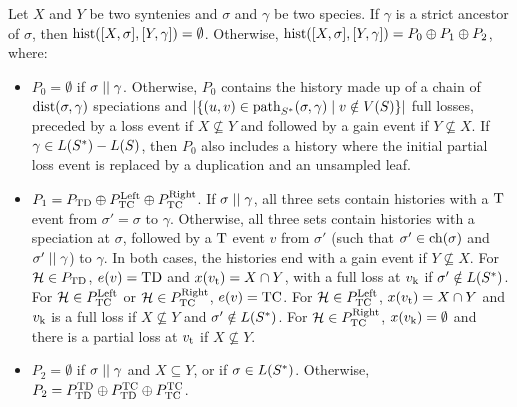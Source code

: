 \begin{theorem}\label{thm:synesth:minimal-paths}
    Let \(X\) and \(Y\) be two syntenies and \(\sigma\) and \(\gamma\) be two species.
    If \(\gamma\) is a strict ancestor of \(\sigma\), then \(\optPath([X, \sigma], [Y, \gamma]) = \emptyset\).
    Otherwise, \(\optPath([X, \sigma], [Y, \gamma]) = P_0 \oplus P_1 \oplus P_2\), where:

    \begin{itemize}
        \item \(P_0 = \emptyset\) if \(\sigma \nottcomp \gamma\).
            Otherwise, \(P_0\) contains the history made up of a chain of \(\tdist(\sigma, \gamma)\) speciations and \(|\{(u, v) \in \tpath[\augS]{\sigma}{\gamma} \mid v \notin \tnodes(\speciesTree)\}|\) full losses, preceded by a loss event if \(X \not\subseteq Y\) and followed by a gain event if \(Y \not\subseteq X\).
            If \(\gamma \in \tleavs(\augS) - \tleavs(\speciesTree)\), then \(P_0\) also includes a history where the initial partial loss event is replaced by a duplication and an unsampled leaf.
        \item \(P_1 = P_\evtTD \oplus  P_\evtTC^{\mathrm{Left}} \oplus P_\evtTC^{\mathrm{Right}}\).
            If \(\sigma \nottcomp \gamma\), all three sets contain histories with a \(\evtT\) event from \(\sigma' = \sigma\) to \(\gamma\).
            Otherwise, all three sets contain histories with a speciation at \(\sigma\), followed by a \(\evtT\) event \(v\) from \(\sigma'\) (such that \(\sigma' \in \children(\sigma)\) and \(\sigma' \nottcomp \gamma\)) to \(\gamma\).
            In both cases, the histories end with a gain event if \(Y \not\subseteq X\).
            For \(\Hist \in P_\evtTD\), \(\eventOf(v) = \evtTD\) and \(\syntenyOf(v\targetChild) = X \cap Y\), with a full loss at \(v\conservChild\) if \(\sigma' \notin \tleavs(\augS)\).
            For \(\Hist \in P_\evtTC^{\mathrm{Left}}\) or \(\Hist \in P_\evtTC^{\mathrm{Right}}\), \(\eventOf(v) = \evtTC\).
            For \(\Hist \in P_\evtTC^{\mathrm{Left}}\), \(\syntenyOf(v\targetChild) = X \cap Y\) and \(v\conservChild\) is a full loss if \(X \not\subseteq Y\) and \(\sigma' \notin \tleavs(\augS)\).
            For \(\Hist \in P_\evtTC^{\mathrm{Right}}\), \(\syntenyOf(v\conservChild) = \emptyset\) and there is a partial loss at \(v\targetChild\) if \(X \not\subseteq Y\).
        \item \(P_2 = \emptyset\) if \(\sigma \nottcomp \gamma\) and \(X \subseteq Y\), or if \(\sigma \in \tleavs(\augS)\).
            Otherwise, \(P_2 = P^\evtTD_\evtTD \oplus P^\evtTC_\evtTD \oplus P^\evtTC_\evtTC\).

\end{itemize}
\end{theorem}

